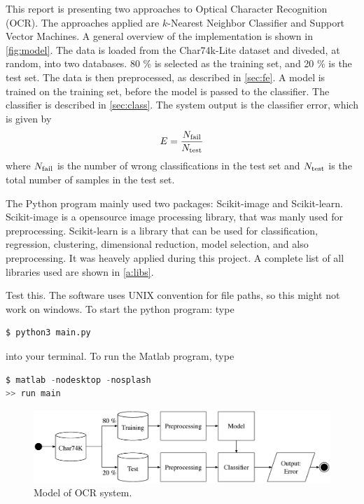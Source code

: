 \documentclass[../main.tex]{subfiles}
\begin{document}
This report is presenting two approaches to Optical Character Recognition (OCR). The approaches applied are $k$-Nearest Neighbor Classifier and Support Vector Machines. A general overview of the implementation is shown in \autoref{fig:model}. The data is loaded from the Char74k-Lite dataset and diveded, at random, into two databases. 80 \% is selected as the training set, and 20 \% is the test set. The data is then preprocessed, as described in \autoref{sec:fe}. A model is trained on the training set, before the model is passed to the classifier. The classifier is described in \autoref{sec:class}. The system output is the classifier error, which is given by
\begin{equation}
	E = \frac{N_{\rm fail}}{N_{\rm test}} \label{eq:error}
\end{equation}
where $N_{\rm fail}$ is the number of wrong classifications in the test set and $N_{\rm test}$ is the total number of samples in the test set. 

The Python program mainly used two packages: Scikit-image and Scikit-learn. Scikit-image is a opensource image processing library, that was manly used for preprocessing. Scikit-learn is a library that can be used for classification, regression, clustering, dimensional reduction, model selection, and also preprocessing. It was heavely applied during this project. A complete list of all libraries used are shown in \autoref{a:libs}.

{\color{red}Test this.} The software uses UNIX convention for file paths, so this might not work on windows. To start the python program: type
\begin{lstlisting}[language=Python]
$ python3 main.py
\end{lstlisting}
into your terminal. To run the Matlab program, type
\begin{lstlisting}[language=Python]
$ matlab -nodesktop -nosplash
>> run main
\end{lstlisting}


\begin{figure}
  \centering
  \includegraphics[width=\textwidth]{figures/model.eps}
  \caption{Model of OCR system.} 
  \label{fig:model}
\end{figure}
\end{document}
